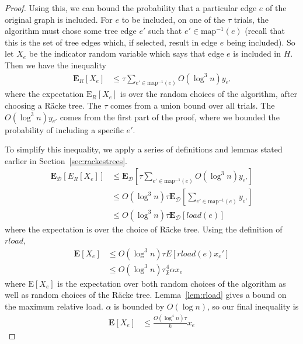 \documentclass[12pt]{article}
\begin{document}
\begin{proof}
Using this, we can bound the probability that a particular edge $e$ of the original graph is included. For $e$ to be included, on one of the $\tau$ trials, the algorithm must chose some tree edge $e'$ such that $e' \in \mathrm{map}^{-1}(e)$ (recall that this is the set of tree edges which, if selected, result in edge $e$ being included). So let $X_e$ be the indicator random variable which says that edge $e$ is included in $H$. Then we have the inequality
\begin{align}
 \textbf{E}_{R}[X_e] &\leq \tau \sum_{e' \in \mathrm{map}^{-1}(e)} O(\log^3 n) y_{e'} 
\end{align}
where the expectation $\text{E}_{R}[X_e]$ is over the random choices of the algorithm, after choosing a R\"{a}cke tree. The $\tau$ comes from a union bound over all trials. The $O(\log^3 n)y_{e'}$ comes from the first part of the proof, where we bounded the probability of including a specific $e'$. 

To simplify this inequality, we apply a series of definitions and lemmas stated earlier in Section~\ref{sec:rackestrees}. 
\begin{align}
\textbf{E}_{\mathcal{D}}[E_{R}[X_e]] &\leq \textbf{E}_{\mathcal{D}}[\tau \sum_{e' \in \mathrm{map}^{-1}(e)} O(\log^3 n) y_{e'}] \\
               &\leq O(\log^3 n) \tau \textbf{E}_{\mathcal{D}}[\sum_{e' \in \mathrm{map}^{-1}(e)} y_{e'}] \\
               & \leq O(\log^3 n) \tau \textbf{E}_{\mathcal{D}}[load(e)]
\end{align}
where the expectation is over the choice of R\"{a}cke tree. Using the definition of $rload$, 
\begin{align}
\textbf{E}[X_e] &\leq O(\log^3 n) \tau E[rload(e) x_e'] \\
                &\leq O(\log^3 n) \tau \frac{4}{k} \alpha x_e
\end{align}
where $\text{E}[X_e]$ is the expectation over both random choices of the algorithm as well as random choices of the R\"{a}cke tree. Lemma~\ref{lem:rload} gives a bound on the maximum relative load. $\alpha$ is bounded by $O( \log n)$, so our final inequality is 
\begin{align}
 \textbf{E}[X_e] &\leq \frac{O(\log^4 n)\tau}{k} x_e 
\end{align}


\end{proof}
\end{document}
